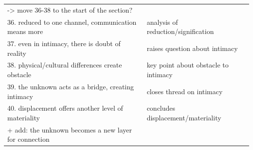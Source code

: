 \documentclass[11pt]{article}
\begin{document}
\begin{center}
\begin{tabular}{ll}
-> move 36-38 to the start of the section? & \\[0pt]
36. reduced to one channel, communication means more & analysis of reduction/signification\\[0pt]
37. even in intimacy, there is doubt of reality & raises question about intimacy\\[0pt]
38. physical/cultural differences create obstacle & key point about obstacle to intimacy\\[0pt]
39. the unknown acts as a bridge, creating intimacy & closes thread on intimacy\\[0pt]
40. displacement offers another level of materiality & concludes displacement/materiality\\[0pt]
+ add: the unknown becomes a new layer for connection & \\[0pt]
\end{tabular}
\end{center}
\end{document}
